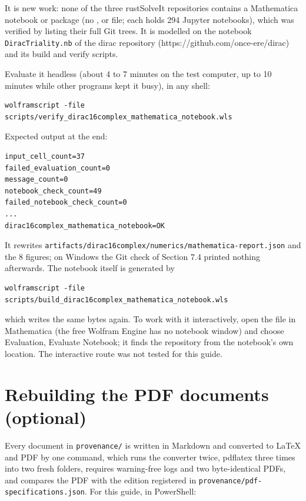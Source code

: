 \documentclass[11pt]{article}
\begin{document}
It is new work: none of the three rustSolveIt repositories contains a Mathematica notebook or package (no \texttt{}, \texttt{} or \texttt{} file; each holds 294 Jupyter notebooks), which was verified by listing their full Git trees. It is modelled on the notebook \texttt{DiracTri\allowbreak{}ality.nb} of the dirac repository (https://github.com/once-ere/dirac) and its build and verify scripts.

Evaluate it headless (about 4 to 7 minutes on the test computer, up to 10 minutes while other programs kept it busy), in any shell:

\begin{Verbatim}[fontsize=\small]
wolframscript -file scripts/verify_dirac16complex_mathematica_notebook.wls
\end{Verbatim}

Expected output at the end:

\begin{Verbatim}[fontsize=\small]
input_cell_count=37
failed_evaluation_count=0
message_count=0
notebook_check_count=49
failed_notebook_check_count=0
...
dirac16complex_mathematica_notebook=OK
\end{Verbatim}

It rewrites \texttt{artifact\allowbreak{}s/dirac1\allowbreak{}6complex\allowbreak{}/numeric\allowbreak{}s/mathem\allowbreak{}atica-re\allowbreak{}port.jso\allowbreak{}n} and the 8 figures; on Windows the Git check of Section 7.4 printed nothing afterwards. The notebook itself is generated by

\begin{Verbatim}[fontsize=\small]
wolframscript -file scripts/build_dirac16complex_mathematica_notebook.wls
\end{Verbatim}

which writes the same bytes again. To work with it interactively, open the \texttt{} file in Mathematica (the free Wolfram Engine has no notebook window) and choose Evaluation, Evaluate Notebook; it finds the repository from the notebook's own location. The interactive route was not tested for this guide.

\section{Rebuilding the PDF documents (optional)}

Every document in \texttt{provenan\allowbreak{}ce/} is written in Markdown and converted to LaTeX and PDF by one command, which runs the converter twice, pdflatex three times into two fresh folders, requires warning-free logs and two byte-identical PDFs, and compares the PDF with the edition registered in \texttt{provenan\allowbreak{}ce/pdf-s\allowbreak{}pecifica\allowbreak{}tions.js\allowbreak{}on}. For this guide, in PowerShell:
\end{document}
